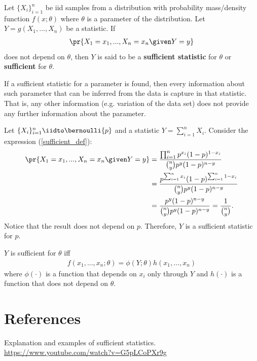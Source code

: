 \documentclass[11pt]{article}
\begin{document}
\begin{definition}
	Let $\{X_i\}_{i=1}^{n}$ be iid samples from a distribution with
	probability mass/density function $f(x;\theta)$ where $\theta$ is
	a parameter of the distribution.
	Let $Y=g(X_1,...,X_n)$ be a statistic.
	If
	\begin{align}\label{sufficient_def}
		\pr{X_1=x_1,...,X_n=x_n\given Y=y}
	\end{align}
	does not depend on $\theta$,
	then $Y$ is said to be a \textbf{sufficient statistic} for $\theta$
	or \textbf{sufficient} for $\theta$.
\end{definition}

\begin{remark}
	If a sufficient statistic for a parameter is found,
	then every information about such parameter that can be inferred from the
	data is capture in that statistic.
	That is, any other information (e.g.\! variation of the data set)
	does not provide any further information about the parameter.
\end{remark}

\begin{example}
	Let $\{X_i\}_{i=1}^{n}\iidto\bernoulli{p}$ and a statistic $Y=\sum_{i=1}^{n}X_i$.
	Consider the expression (\ref{sufficient_def}):
	\begin{align*}
		\pr{X_1=x_1,...,X_n=x_n\given Y=y}
		&= \frac{ \prod_{i=1}^{n} p^{x_i} (1-p)^{1-x_i} }{ {n\choose y}p^{y}(1-p)^{n-y} } \\
		&= \frac{ p^{\sum_{i=1}^{n}x_i} (1-p)^{\sum_{i=1}^{n}1-x_i} }{ {n\choose y}p^{y}(1-p)^{n-y} } \\
		&= \frac{ p^{y}(1-p)^{n-y} }{ {n\choose y}p^{y}(1-p)^{n-y} }
		= \frac{1}{{n\choose y}}.
	\end{align*}
	Notice that the result does not depend on $p$.
	Therefore, $Y$ is a sufficient statistic for $p$.
\end{example}

\begin{theorem}
	$Y$ is sufficient for $\theta$ iff
	\begin{align*}
		f(x_1,...,x_n;\theta) = \phi(Y;\theta)h(x_1,...,x_n)
	\end{align*}
	where $\phi(\cdot)$ is a function that depends on $x_i$ only through $Y$
	and $h(\cdot)$ is a function that does not depend on $\theta$.
\end{theorem}

\vfill

\section*{References}

\begin{enumerate}[label = {[\arabic*]}]
	\item Explanation and examples of sufficient statistics. \url{https://www.youtube.com/watch?v=G5pLCoPXr9g}
\end{enumerate}
\end{document}
